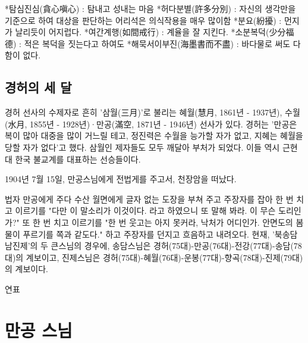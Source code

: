 \documentclass[12pt, a4paper, oneside]{book}
\let\stdsection\section
\renewcommand\section{\newpage\stdsection}
\begin{document}
 


*탐심진심(貪心嗔心) : 탐내고 성내는 마음
*허다분별(許多分別) : 자신의 생각만을 기준으로 하여 대상을 판단하는 어리석은 의식작용을 매우 많이함
*분요(紛擾) : 먼지가 날리듯이 어지럽다.
*여간계행(如間戒行) : 계율을 잘 지킨다.
*소분복덕(少分福德) : 적은 복덕을 짓는다고 하여도
*해묵서이부진(海墨書而不盡) : 바다물로 써도 다함이 없다.   





%										
	\section{ 경허의 세 달}

경허 선사의 수제자로 흔히 '삼월(三月)'로 불리는 혜월(慧月, 1861년 - 1937년), 수월(水月, 1855년 - 1928년)·만공(滿空, 1871년 - 1946년) 선사가 있다. 경허는 '만공은 복이 많아 대중을 많이 거느릴 테고, 정진력은 수월을 능가할 자가 없고, 지혜는 혜월을 당할 자가 없다'고 했다. 삼월인 제자들도 모두 깨달아 부처가 되었다. 이들 역시 근현대 한국 불교계를 대표하는 선승들이다.

1904년 7월 15일, 만공스님에게 전법게를 주고서, 천장암을 떠났다.

법자 만공에게 주다
수산 월면에게 글자 없는 도장을 부쳐 주고 주장자를 잡아 한 번 치고 이르기를 "다만 이 말소리가 이것이다. 라고 하였으니 또 말해 봐라. 이 무슨 도리인가?"
또 한 번 치고 이르기를 "한 번 웃고는 아지 못커라, 낙처가 어디인가. 안면도의 봄물이 푸르기를 쪽과 같도다." 하고 주장자를 던지고 흐음하고 내려오다.
현재, '북송담 남진제'의 두 큰스님의 경우에, 송담스님은 경허(75대)-만공(76대)-전강(77대)-송담(78대)의 계보이고, 진제스님은 경허(75대)-혜월(76대)-운봉(77대)-향곡(78대)-진제(79대)의 계보이다.

연표

%										
	\chapter{ 만공 스님}


%										
\end{document}

